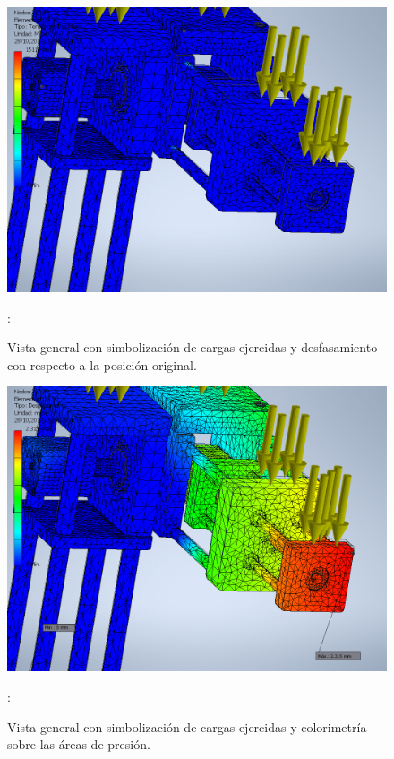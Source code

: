 \documentclass[11pt,a4paper,oldfontcommands,oneside]{memoir}
\begin{document}
\begin{flushleft}

\begin{figure}
\begin{center}
\includegraphics[scale=.55]{cb1.png}
\end{center}
\caption{Vista general con simbolización de cargas ejercidas y desfasamiento con respecto a la posición original.}
\label{tabla12}:
\end{figure}

\begin{figure}
\begin{center}
\includegraphics[scale=.55]{cb2.png}
\end{center}
\caption{Vista general con simbolización de cargas ejercidas y colorimetría sobre las áreas de presión.}
\label{tabla13}:
\end{figure}


\end{flushleft}
\end{document}
